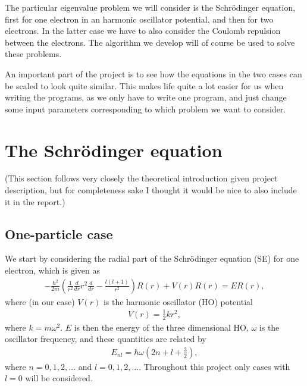 \documentclass[12pt, a4paper]{article}
\begin{document}
The particular eigenvalue problem we will consider is the Schrödinger equation, first for one electron in 
an harmonic oscillator potential, and then for two electrons. In the latter case we have to also 
consider the Coulomb repulsion between the electrons. The algorithm we develop will of course be used 
to solve these problems. 

An important part of the project is to see how the equations in the two cases can be scaled to look 
quite similar. This makes life quite a lot easier for us when writing the programs, as we only have to 
write one program, and just change some input parameters corresponding to which problem we want to 
consider.   

\section{The Schrödinger equation}

(This section follows very closely the theoretical introduction given project description, but 
for completeness sake I thought it would be nice to also include it in the report.) 

\subsection{One-particle case}

We start by considering the radial part of the Schrödinger equation (SE) for one electron, which is 
given as 
\begin{align}
- \frac{\hbar^2}{2m}\left( \frac{1}{r^2} \frac{d}{dr}r^2 \frac{d}{dr} - \frac{l(l+1)}{r^2} \right) R(r) 
+ V(r) R(r) = ER(r),
\label{eq:SE}    
\end{align}    
where (in our case) $V(r)$ is the harmonic oscillator (HO) potential 
\begin{align*}
V(r) = \frac{1}{2} k r^2, 
\end{align*}
where $k = m\omega^2$. $E$ is then the energy of the three dimensional HO, $\omega$ is the 
oscillator frequency, and these quantities are related by 
\begin{align*}
E_{nl} = \hbar \omega \left( 2n + l + \frac{3}{2} \right), 
\end{align*}
where $n = 0,1,2,\dots$ and $l = 0,1,2,\dots$. Throughout this project only cases with $l = 0$ will be 
considered. 
\end{document}
